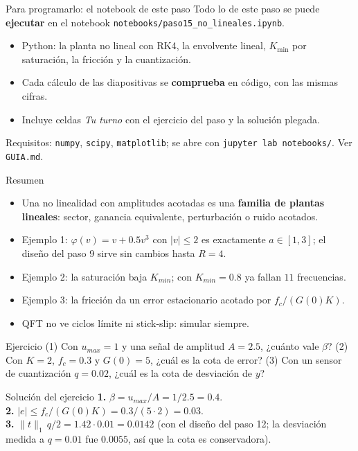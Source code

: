 \documentclass[aspectratio=169,11pt]{beamer}
\begin{document}
\begin{frame}{Para programarlo: el notebook de este paso}
  \small
  Todo lo de este paso se puede \textbf{ejecutar} en el notebook \texttt{notebooks/paso15\_no\_lineales.ipynb}.
  \begin{itemize}
    \item Python: la planta no lineal con RK4, la envolvente lineal, $K_{\min}$ por saturación, la fricción y la cuantización.
    \item Cada cálculo de las diapositivas se \textbf{comprueba} en código, con las mismas cifras.
    \item Incluye celdas \emph{Tu turno} con el ejercicio del paso y la solución plegada.
  \end{itemize}
  \footnotesize Requisitos: \texttt{numpy}, \texttt{scipy}, \texttt{matplotlib}; se abre con \texttt{jupyter lab notebooks/}. Ver \texttt{GUIA.md}.
\end{frame}

\begin{frame}{Resumen}
  \small
  \begin{itemize}
    \item Una no linealidad con amplitudes acotadas es una \textbf{familia de plantas lineales}: sector, ganancia equivalente, perturbación o ruido acotados.
    \item Ejemplo 1: $\varphi(v)=v+0.5v^3$ con $|v|\le2$ es exactamente $a\in[1,3]$; el diseño del paso 9 sirve sin cambios hasta $R=4$.
    \item Ejemplo 2: la saturación baja $K_{min}$; con $K_{min}=0.8$ ya fallan $11$ frecuencias.
    \item Ejemplo 3: la fricción da un error estacionario acotado por $f_c/(G(0)K)$.
    \item QFT no ve ciclos límite ni stick-slip: simular siempre.
  \end{itemize}
  \begin{block}{Ejercicio}
    (1) Con $u_{max}=1$ y una señal de amplitud $A=2.5$, ¿cuánto vale $\beta$? (2) Con $K=2$, $f_c=0.3$ y $G(0)=5$, ¿cuál es la cota de error? (3) Con un sensor de cuantización $q=0.02$, ¿cuál es la cota de desviación de $y$?
  \end{block}
\end{frame}

\appendix
\begin{frame}{Solución del ejercicio}
  \footnotesize
  \textbf{1.} $\beta=u_{max}/A=1/2.5=0.4$.\\[3pt]
  \textbf{2.} $|e|\le f_c/(G(0)K)=0.3/(5\cdot2)=0.03$.\\[3pt]
  \textbf{3.} $\|t\|_1\,q/2=1.42\cdot0.01=0.0142$ (con el diseño del paso 12; la desviación medida a $q=0.01$ fue $0.0055$, así que la cota es conservadora).
\end{frame}
\end{document}
